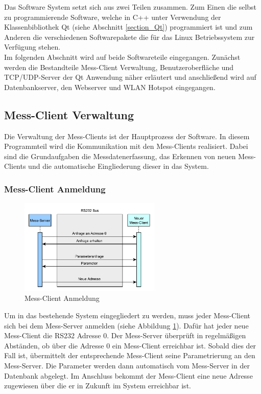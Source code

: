 Das Software System setzt sich aus zwei Teilen zusammen. Zum Einen die selbst zu programmierende Software, welche in C++ unter Verwendung der Klassenbibliothek Qt (siehe Abschnitt \ref{section_Qt}) programmiert ist und zum Anderen die verschiedenen Softwarepakete die für das Linux Betriebssystem zur Verfügung stehen.\\
Im folgenden Abschnitt wird auf beide Softwareteile eingegangen. Zunächst werden die Bestandteile Mess-Client Verwaltung, Benutzeroberfläche und TCP/UDP-Server der Qt Anwendung näher erläutert und anschließend wird auf Datenbankserver, den Webserver und WLAN Hotspot eingegangen.

\subsection{Mess-Client Verwaltung}
\label{section_messclientverwaltung}
Die Verwaltung der Mess-Clients ist der Hauptprozess der Software. In diesem Programmteil wird die Kommunikation mit den Mess-Clients realisiert. Dabei sind die Grundaufgaben die Messdatenerfassung, das Erkennen von neuen Mess-Clients und die automatische Eingliederung dieser in das System.

\subsubsection{Mess-Client Anmeldung}

\begin{figure}[H]
\begin{center}
\includegraphics[width=0.6\textwidth ]{img/general/MessClientAnmeldung.pdf}
\caption{Mess-Client Anmeldung}
\label{figure_MessClientAnmeldung}
\end{center}
\end{figure}
 
 
Um in das bestehende System eingegliedert zu werden, muss jeder Mess-Client sich bei dem Mess-Server anmelden (siehe Abbildung \ref{figure_MessClientAnmeldung}). Dafür hat jeder neue Mess-Client die RS232 Adresse 0. Der Mess-Server überprüft in regelmäßigen Abständen, ob über die Adresse 0 ein Mess-Client erreichbar ist. Sobald dies der Fall ist, übermittelt der entsprechende Mess-Client seine Parametrierung an den Mess-Server. Die Parameter werden dann automatisch vom Mess-Server in der Datenbank abgelegt. Im Anschluss bekommt der Mess-Client eine neue Adresse zugewiesen über die er in Zukunft im System erreichbar ist.



